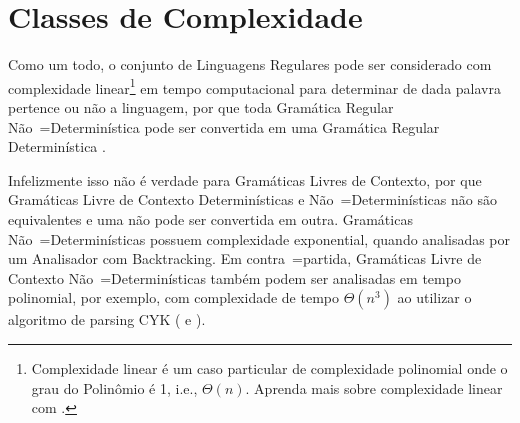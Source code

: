 \section{Classes de Complexidade}
\label{classesDeComplexidade}

    Como um todo,
    o conjunto de Linguagens Regulares pode ser considerado com complexidade linear\footnote{
    Complexidade linear é um caso particular de complexidade polinomial onde o grau do Polinômio é 1,
    i.e.,
    $\Theta(n)$.
    Aprenda mais sobre complexidade linear com .
    }
    em tempo computacional para determinar de dada palavra pertence ou
    não a linguagem,
    por que toda Gramática Regular Não~=Determinística pode ser convertida em uma Gramática Regular Determinística \cite{sipserBook}.

    Infelizmente isso não é verdade para Gramáticas Livres de Contexto,
    por que Gramáticas Livre de Contexto Determinísticas e
    Não~=Determinísticas não são equivalentes e
    uma não pode ser convertida em outra.
    Gramáticas Não~=Determinísticas possuem complexidade exponential,
    quando analisadas por um Analisador com Backtracking.
    Em contra~=partida,
    Gramáticas Livre de Contexto Não~=Determinísticas também podem ser analisadas em tempo polinomial,
    por exemplo,
    com complexidade de tempo $\Theta(n^3)$ ao utilizar o algoritmo de parsing CYK ( e
    ).


